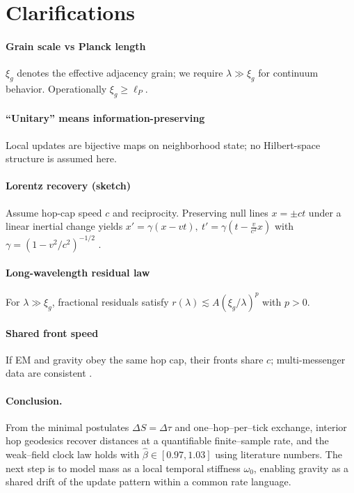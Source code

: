 \section*{Clarifications}
\paragraph{Grain scale vs Planck length}
\(\xi_g\) denotes the effective adjacency grain; we require \(\lambda\gg\xi_g\) for continuum behavior. Operationally \(\xi_g\ge \ell_P\).
\paragraph{``Unitary'' means information-preserving}
Local updates are bijective maps on neighborhood state; no Hilbert-space structure is assumed here.
\paragraph{Lorentz recovery (sketch)}
Assume hop-cap speed \(c\) and reciprocity. Preserving null lines \(x=\pm ct\) under a linear inertial change yields
\(x'=\gamma(x-vt),\ t'=\gamma(t-\frac{v}{c^2}x)\) with \(\gamma=(1-v^2/c^2)^{-1/2}\) \cite{einstein1905}.
\paragraph{Long-wavelength residual law}
For \(\lambda\gg\xi_g\), fractional residuals satisfy \(r(\lambda)\lesssim A(\xi_g/\lambda)^p\) with \(p>0\).
\paragraph{Shared front speed}
If EM and gravity obey the same hop cap, their fronts share \(c\); multi-messenger data are consistent \cite{abbott2017gw170817}.

\paragraph{Conclusion.}
From the minimal postulates $\Delta S=\Delta\tau$ and one--hop--per--tick exchange, interior hop geodesics recover distances at a quantifiable finite--sample rate, and the weak--field clock law holds with $\hat\beta\in[0.97,1.03]$ using literature numbers. The next step is to model mass as a local temporal stiffness $\omega_0$, enabling gravity as a shared drift of the update pattern within a common rate language.